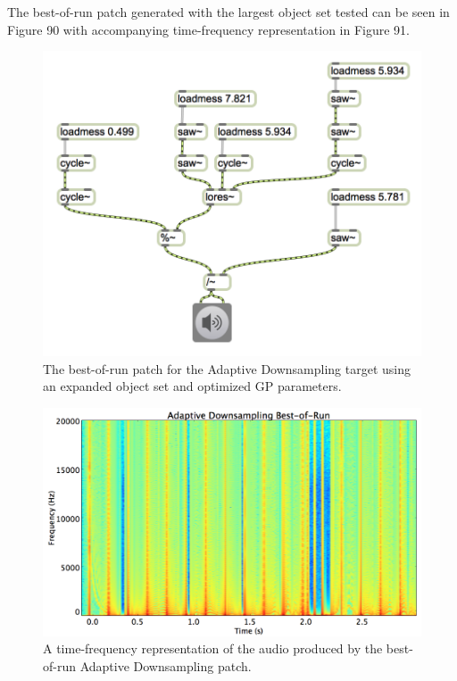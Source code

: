 \documentclass[12pt]{report} 	%
\numberwithin{figure}{chapter}
\numberwithin{table}{chapter}
\numberwithin{equation}{chapter}
\begin{document}
\begin{flushleft}
The best-of-run patch generated with the largest object set tested can be seen in Figure 90 with accompanying time-frequency representation in Figure 91.
\begin{figure}[h!]
\begin{center}
\includegraphics[width=\linewidth]{AdaptiveDownsample_Best}
\caption[Adaptive downsampling best-of-run patch]{The best-of-run patch for the Adaptive Downsampling target using an expanded object set and optimized GP parameters.}
\end{center}
\end{figure}
\begin{figure}[h!]
\begin{center}
\includegraphics[scale=0.35,width=\linewidth]{AdaptiveDownsamplingBestOfRunSTFT}
\caption[Best-of-run adaptive downsampling time-frequency representation]{A time-frequency representation of the audio produced by the best-of-run Adaptive Downsampling patch.}
\end{center}
\end{figure}


\end{flushleft}
\end{document}
